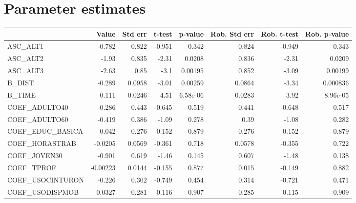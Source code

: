 \section{Parameter estimates}
\begin{tabular}{lrrrrrrr}
\toprule
{} &    Value &  Std err &  t-test &  p-value &  Rob. Std err &  Rob. t-test &  Rob. p-value \\
\midrule
ASC\_ALT1         &   -0.782 &    0.822 &  -0.951 &    0.342 &         0.824 &       -0.949 &         0.343 \\
ASC\_ALT2         &    -1.93 &    0.835 &   -2.31 &   0.0208 &         0.836 &        -2.31 &        0.0209 \\
ASC\_ALT3         &    -2.63 &     0.85 &    -3.1 &  0.00195 &         0.852 &        -3.09 &       0.00199 \\
B\_DIST           &   -0.289 &   0.0958 &   -3.01 &  0.00259 &        0.0864 &        -3.34 &      0.000836 \\
B\_TIME           &    0.111 &   0.0246 &    4.51 & 6.58e-06 &        0.0283 &         3.92 &      8.96e-05 \\
COEF\_ADULTO40    &   -0.286 &    0.443 &  -0.645 &    0.519 &         0.441 &       -0.648 &         0.517 \\
COEF\_ADULTO60    &   -0.419 &    0.386 &   -1.09 &    0.278 &          0.39 &        -1.08 &         0.282 \\
COEF\_EDUC\_BASICA &    0.042 &    0.276 &   0.152 &    0.879 &         0.276 &        0.152 &         0.879 \\
COEF\_HORASTRAB   &  -0.0205 &   0.0569 &  -0.361 &    0.718 &        0.0578 &       -0.355 &         0.722 \\
COEF\_JOVEN30     &   -0.901 &    0.619 &   -1.46 &    0.145 &         0.607 &        -1.48 &         0.138 \\
COEF\_TPROF       & -0.00223 &   0.0144 &  -0.155 &    0.877 &         0.015 &       -0.149 &         0.882 \\
COEF\_USOCINTURON &   -0.226 &    0.302 &  -0.749 &    0.454 &         0.314 &       -0.721 &         0.471 \\
COEF\_USODISPMOB  &  -0.0327 &    0.281 &  -0.116 &    0.907 &         0.285 &       -0.115 &         0.909 \\
\bottomrule
\end{tabular}

